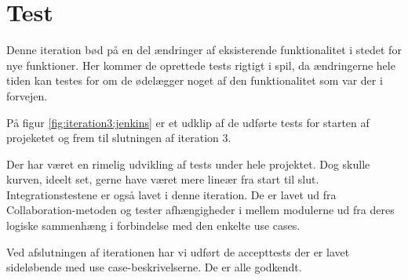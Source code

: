 \section{Test}

Denne iteration bød på en del ændringer af eksisterende funktionalitet i stedet for nye funktioner. Her kommer de oprettede tests rigtigt i spil, da ændringerne hele tiden kan testes for om de ødelægger noget af den funktionalitet som var der i forvejen.

På figur \ref{fig:iteration3:jenkins} er et udklip af de udførte tests for starten af projeketet og frem til slutningen af iteration 3.


Der har været en rimelig udvikling af tests under hele projektet. Dog skulle kurven, ideelt set, gerne have været mere lineær fra start til slut.
Integrationstestene er også lavet i denne iteration. De er lavet ud fra Collaboration-metoden og tester afhængigheder i mellem modulerne ud fra deres logiske sammenhæng i forbindelse med den enkelte use cases.

Ved afslutningen af iterationen har vi udført de accepttests der er lavet sideløbende med use case-beskrivelserne. De er alle godkendt.